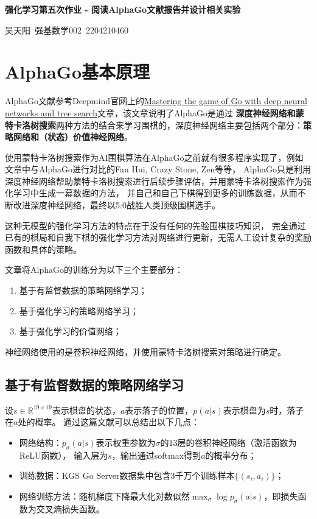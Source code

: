 \documentclass[12pt, a4paper, oneside]{ctexart}
\numberwithin{equation}{section}  %
\newenvironment{myTitle}[1]{
    \begin{center}
    {\zihao{-2}\bf #1\\}
    \zihao{-4}\it
}{\end{center}}  %
\def\R{\mathbb{R}}          %
\begin{document}
\begin{myTitle}{强化学习第五次作业 - 阅读AlphaGo文献报告并设计相关实验}
    吴天阳\ 强基数学002\ 2204210460
\end{myTitle}
\section{AlphaGo基本原理}
AlphaGo文献参考Deepmind官网上的\href{file:///home/wty/Documents/DeepLearning/Reinforcement_Learning/paper/AlphaGoNaturePaper.pdf}
{Mastering the game of Go with deep neural networks and tree search}文章，该文章说明了AlphaGo是通过
\textbf{深度神经网络和蒙特卡洛树搜索}两种方法的结合来学习围棋的，深度神经网络主要包括两个部分：\textbf{策略网络和（状态）价值神经网络}。

使用蒙特卡洛树搜索作为AI围棋算法在AlphaGo之前就有很多程序实现了，例如文章中与AlphaGo进行对比的Fan Hui, Crazy Stone, Zen等等，
AlphaGo只是利用深度神经网络帮助蒙特卡洛树搜索进行后续步骤评估，并用蒙特卡洛树搜索作为强化学习中生成一幕数据的方法，
并自己和自己下棋得到更多的训练数据，从而不断改进深度神经网络，最终以5:0战胜人类顶级围棋选手。

这种无模型的强化学习方法的特点在于没有任何的先验围棋技巧知识，
完全通过已有的棋局和自我下棋的强化学习方法对网络进行更新，无需人工设计复杂的奖励函数和具体的策略。

文章将AlphaGo的训练分为以下三个主要部分：
\begin{enumerate}
    \item 基于有监督数据的策略网络学习；
    \item 基于强化学习的策略网络学习；
    \item 基于强化学习的价值网络；
\end{enumerate}
神经网络使用的是卷积神经网络，并使用蒙特卡洛树搜索对策略进行确定。

\subsection{基于有监督数据的策略网络学习}

设$s\in \R^{19\times 19}$表示棋盘的状态，$a$表示落子的位置，$p(a|s)$表示棋盘为$s$时，落子在$a$处的概率。
通过这篇文献可以总结出以下几点：
\begin{itemize}
    \item 网络结构：$p_{\sigma}(a|s)$表示权重参数为$\sigma$的$13$层的卷积神经网络（激活函数为ReLU函数），
    输入层为$s$，输出通过softmax得到$a$的概率分布；
    \item 训练数据：KGS Go Server数据集中包含3千万个训练样本$\{(s_i,a_i)\}$；
    \item 网络训练方法：随机梯度下降最大化对数似然$\max_{\sigma}\log p_{\sigma}(a|s)$，即损失函数为交叉熵损失函数。
\end{itemize}
\end{document}
